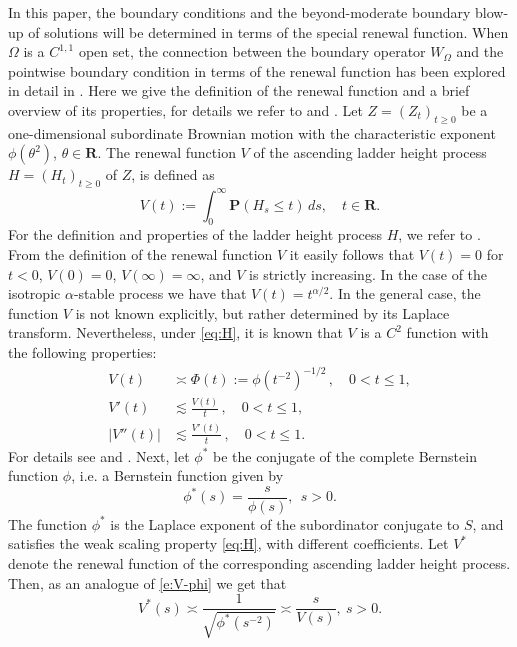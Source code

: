 \documentclass[a4paper,12pt,draft]{article}
\theoremstyle{plain}
\theoremstyle{definition}
\numberwithin{equation}{section}
\newcommand\R{\mathbf{R}}
\renewcommand{\le}{\leqslant}
\renewcommand{\leq}{\leqslant}
\renewcommand{\ge}{\geqslant}
\newcommand{\1}{1}
\begin{document}
In this paper, the boundary conditions and the beyond-moderate boundary blow-up of solutions will be determined in terms of the special renewal function. When $\Omega$ is a $C^{1,1}$ open set, the connection between the boundary operator $W_\Omega$ and the pointwise boundary condition in terms of the renewal function has been explored in detail in \cite[Subsection 4.7, (4.18), (4.19), (4.25)]{BVW}. Here we give the definition of the renewal function and a brief overview of its properties, for details we refer to \cite[Section VI]{bertoin} and \cite{KSV12b}. Let $Z=(Z_t)_{t\ge 0}$ be a one-dimensional subordinate Brownian motion with the characteristic exponent $\phi(\theta^2)$, $\theta\in \R$. The renewal function $V$ of the ascending ladder height process $H=(H_t)_{t\ge 0}$ of $Z$, is defined as
$$
V(t):=\int_0^{\infty}\mathbf P(H_s\le t)\, ds, \quad t\in \R.
$$
For the definition and properties of the ladder height process $H$, we refer to \cite[Section VI.1]{bertoin}. From the definition of the renewal function $V$ it easily follows that $V(t)=0$ for $t<0$, $V(0)=0$, $V(\infty)=\infty$, and $V$ is strictly increasing. In the case of the isotropic $\alpha$-stable process we have that $V(t)=t^{\alpha/2}$. In the general case, the function $V$ is not known explicitly, but rather determined by its Laplace transform. Nevertheless, under \eqref{eq:H}, it is known that $V$ is a $C^2$ function with the following properties:
\begin{align}
V(t) &\asymp \Phi(t):=\phi(t^{ -2})^{-1/2}\, ,\quad 0<t\leq 1,\label{e:V-phi}\\
V'(t)&\lesssim\frac{V(t)}{t}\, ,\quad 0<t\leq 1,\label{eq:H1}\\
|V''(t)|&\lesssim\frac{V'(t)}{t}\, ,\quad 0<t\leq 1.\label{eq:H2}
\end{align}
For details see \cite[Lemma 2.4, Lemma 2.5]{KKLL} and \cite{KSV12b}. Next, let $\phi^*$ be the conjugate of the complete Bernstein function $\phi$, i.e. a Bernstein function given by
\begin{equation}\label{eq:phistar}
 \phi^*(s)=\frac s{\phi(s)},\ \ s>0.
\end{equation}
The function $\phi^*$ is the Laplace exponent of the subordinator conjugate to $S$, and satisfies the weak scaling property \eqref{eq:H}, with different coefficients. Let $V^*$ denote the renewal function of the corresponding ascending ladder height process. Then, as an analogue of \eqref{e:V-phi} we get that
\begin{equation}\label{eq:Vstar}
V^*(s)\asymp\frac1{\sqrt{\phi^*(s^{-2})}}\asymp\frac{s}{V(s)},\ s>0.
\end{equation}
\end{document}
